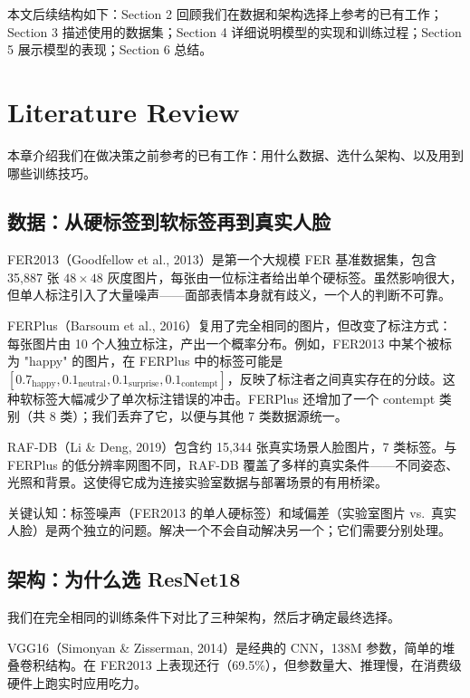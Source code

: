 \documentclass[12pt,a4paper]{ctexart}
\begin{document}
本文后续结构如下：Section 2 回顾我们在数据和架构选择上参考的已有工作；Section 3 描述使用的数据集；Section 4 详细说明模型的实现和训练过程；Section 5 展示模型的表现；Section 6 总结。

\section{Literature Review}

本章介绍我们在做决策之前参考的已有工作：用什么数据、选什么架构、以及用到哪些训练技巧。

\subsection{数据：从硬标签到软标签再到真实人脸}

FER2013（Goodfellow et al., 2013）是第一个大规模 FER 基准数据集，包含 35,887 张 $48\times48$ 灰度图片，每张由一位标注者给出单个硬标签。虽然影响很大，但单人标注引入了大量噪声——面部表情本身就有歧义，一个人的判断不可靠。

FERPlus（Barsoum et al., 2016）复用了完全相同的图片，但改变了标注方式：每张图片由 10 个人独立标注，产出一个概率分布。例如，FER2013 中某个被标为 "happy" 的图片，在 FERPlus 中的标签可能是 $[0.7_{\text{happy}}, 0.1_{\text{neutral}}, 0.1_{\text{surprise}}, 0.1_{\text{contempt}}]$，反映了标注者之间真实存在的分歧。这种软标签大幅减少了单次标注错误的冲击。FERPlus 还增加了一个 contempt 类别（共 8 类）；我们丢弃了它，以便与其他 7 类数据源统一。

RAF-DB（Li \& Deng, 2019）包含约 15,344 张真实场景人脸图片，7 类标签。与 FERPlus 的低分辨率网图不同，RAF-DB 覆盖了多样的真实条件——不同姿态、光照和背景。这使得它成为连接实验室数据与部署场景的有用桥梁。

关键认知：标签噪声（FER2013 的单人硬标签）和域偏差（实验室图片 vs.\ 真实人脸）是两个独立的问题。解决一个不会自动解决另一个；它们需要分别处理。

\subsection{架构：为什么选 ResNet18}

我们在完全相同的训练条件下对比了三种架构，然后才确定最终选择。

VGG16（Simonyan \& Zisserman, 2014）是经典的 CNN，138M 参数，简单的堆叠卷积结构。在 FER2013 上表现还行（69.5\%），但参数量大、推理慢，在消费级硬件上跑实时应用吃力。
\end{document}
